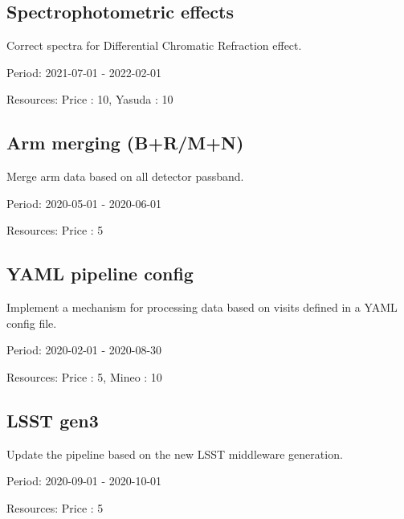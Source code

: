 \subsection{Spectrophotometric effects}

Correct spectra for Differential Chromatic Refraction effect.

Period: 2021-07-01 - 2022-02-01

Resources: Price : 10, Yasuda : 10

\subsection{Arm merging (B+R/M+N)}

Merge arm data based on all detector passband.

Period: 2020-05-01 - 2020-06-01

Resources: Price : 5

\subsection{YAML pipeline config}

Implement a mechanism for processing data based on visits defined in a YAML config file.

Period: 2020-02-01 - 2020-08-30

Resources: Price : 5, Mineo : 10

\subsection{LSST gen3}

Update the pipeline based on the new LSST middleware generation.

Period: 2020-09-01 - 2020-10-01

Resources: Price : 5

